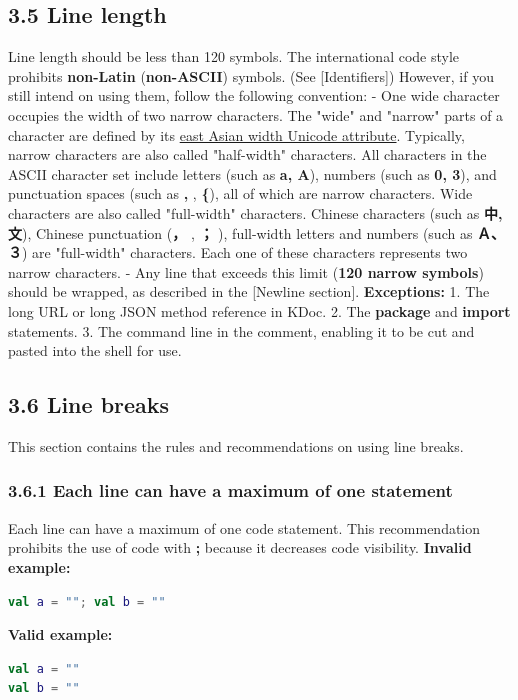 \subsection*{\textbf{3.5 Line length}}
\label{sec:3.5}
Line length should be less than 120 symbols. The international code style prohibits \textbf{non-Latin} (\textbf{non-ASCII}) symbols.
(See [Identifiers]) However, if you still intend on using them, follow the following convention:
- One wide character occupies the width of two narrow characters.
The "wide" and "narrow" parts of a character are defined by its \href{https://unicode.org/reports/tr11/}{east Asian width Unicode attribute}.
Typically, narrow characters are also called "half-width" characters.
All characters in the ASCII character set include letters (such as \textbf{a, A}), numbers (such as \textbf{0, 3}), and punctuation spaces (such as \textbf{,} , \textbf{\{}), all of which are narrow characters.
Wide characters are also called "full-width" characters. Chinese characters (such as \textbf{中, 文}), Chinese punctuation (\textbf{，} , \textbf{；} ), full-width letters and numbers (such as \textbf{Ａ、３}) are "full-width" characters.
Each one of these characters represents two narrow characters.
- Any line that exceeds this limit (\textbf{120 narrow symbols}) should be wrapped, as described in the [Newline section]. 
\textbf{Exceptions:}
1.	The long URL or long JSON method reference in KDoc.
2.	The \textbf{package} and \textbf{import} statements.
3.	The command line in the comment, enabling it to be cut and pasted into the shell for use.
\subsection*{\textbf{3.6 Line breaks}}
\label{sec:3.6}
This section contains the rules and recommendations on using line breaks.
\subsubsection*{\textbf{3.6.1 Each line can have a maximum of one statement}}
\leavevmode\newline
\label{sec:3.6.1}
Each line can have a maximum of one code statement. This recommendation prohibits the use of code with \textbf{;} because it decreases code visibility.
\textbf{Invalid example:}
\begin{lstlisting}[language=Kotlin]
val a = ""; val b = ""
\end{lstlisting}
\textbf{Valid example:}
\begin{lstlisting}[language=Kotlin]
val a = ""
val b = ""
\end{lstlisting}
